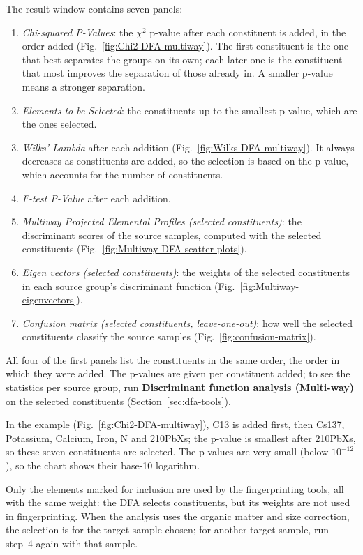\documentclass[12pt]{report}
\begin{document}
The result window contains seven panels:
\begin{enumerate}
    \item \textit{Chi-squared P-Values}: the $\chi^2$ p-value after each constituent is added, in the order added (Fig.~\ref{fig:Chi2-DFA-multiway}). The first constituent is the one that best separates the groups on its own; each later one is the constituent that most improves the separation of those already in. A smaller p-value means a stronger separation.
    \item \textit{Elements to be Selected}: the constituents up to the smallest p-value, which are the ones selected.
    \item \textit{Wilks' Lambda} after each addition (Fig.~\ref{fig:Wilks-DFA-multiway}). It always decreases as constituents are added, so the selection is based on the p-value, which accounts for the number of constituents.
    \item \textit{F-test P-Value} after each addition.
    \item \textit{Multiway Projected Elemental Profiles (selected constituents)}: the discriminant scores of the source samples, computed with the selected constituents (Fig.~\ref{fig:Multiway-DFA-scatter-plots}).
    \item \textit{Eigen vectors (selected constituents)}: the weights of the selected constituents in each source group's discriminant function (Fig.~\ref{fig:Multiway-eigenvectors}).
    \item \textit{Confusion matrix (selected constituents, leave-one-out)}: how well the selected constituents classify the source samples (Fig.~\ref{fig:confusion-matrix}).
\end{enumerate}
All four of the first panels list the constituents in the same order, the order in which they were added. The p-values are given per constituent added; to see the statistics per source group, run \textbf{Discriminant function analysis (Multi-way)} on the selected constituents (Section~\ref{sec:dfa-tools}).

In the example (Fig.~\ref{fig:Chi2-DFA-multiway}), C13 is added first, then Cs137, Potassium, Calcium, Iron, N and 210PbXs; the p-value is smallest after 210PbXs, so these seven constituents are selected. The p-values are very small (below $10^{-12}$), so the chart shows their base-10 logarithm.

\begin{tcolorbox}[colback=yellow!10,colframe=yellow!50!black,title=Note]
Only the elements marked for inclusion are used by the fingerprinting tools, all with the same weight: the DFA selects constituents, but its weights are not used in fingerprinting. When the analysis uses the organic matter and size correction, the selection is for the target sample chosen; for another target sample, run step~4 again with that sample.
\end{tcolorbox}
\end{document}
